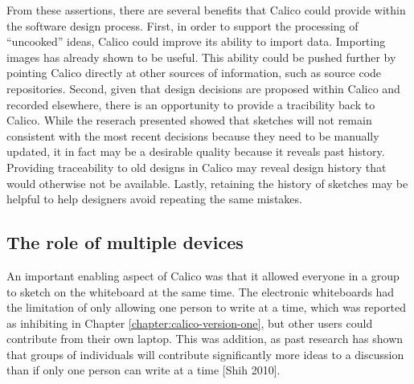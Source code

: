 

%

From these assertions, there are several benefits that Calico could provide within the software design process. First, in order to support the processing of ``uncooked'' ideas, Calico could improve its ability to import data. Importing images has already shown to be useful. This ability could be pushed further by pointing Calico directly at other sources of information, such as source code repositories. Second, given that design decisions are proposed within Calico and recorded elsewhere, there is an opportunity to provide a tracibility back to Calico. While the reserach presented showed that sketches will not remain consistent with the most recent decisions because they need to be manually updated, it in fact may be a desirable quality because it reveals past history. Providing traceability to old designs in Calico may reveal design history that would otherwise not be available. Lastly, retaining the history of sketches may be helpful to help designers avoid repeating the same mistakes.

\subsection{The role of multiple devices}

An important enabling aspect of Calico was that it allowed everyone in a group to sketch on the whiteboard at the same time. The electronic whiteboards had the limitation of only allowing one person to write at a time, which was reported as inhibiting in Chapter \ref{chapter:calico-version-one}, but other users could contribute from their own laptop. This was addition, as past research has shown that groups of individuals will contribute significantly more ideas to a discussion than if only one person can write at a time [Shih 2010].

